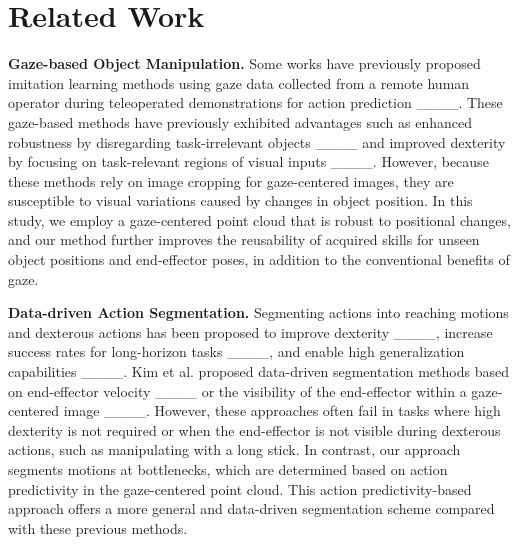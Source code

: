 \section{Related Work}
\textbf{Gaze-based Object Manipulation.} 
Some works have previously proposed imitation learning methods using gaze data collected from a remote human operator during teleoperated demonstrations for action prediction ____. These gaze-based methods have previously exhibited advantages such as enhanced robustness by disregarding task-irrelevant objects ____ and improved dexterity by focusing on task-relevant regions of visual inputs ____. 
However, because these methods rely on image cropping for gaze-centered images, they are susceptible to visual variations caused by changes in object position.
In this study, we employ a gaze-centered point cloud that is robust to positional changes, and our method further improves the reusability of acquired skills for unseen object positions and end-effector poses, in addition to the conventional benefits of gaze.

\textbf{Data-driven Action Segmentation.} 
Segmenting actions into reaching motions and dexterous actions has been proposed to improve dexterity ____, increase success rates for long-horizon tasks ____, and enable high generalization capabilities ____. 
Kim et al. proposed data-driven segmentation methods based on end-effector velocity ____ or the visibility of the end-effector within a gaze-centered image ____. However, these approaches often fail in tasks where high dexterity is not required or when the end-effector is not visible during dexterous actions, such as manipulating with a long stick.
In contrast, our approach segments motions at bottlenecks, which are determined based on action predictivity in the gaze-centered point cloud. 
This action predictivity-based approach offers a more general and data-driven segmentation scheme compared with these previous methods.

